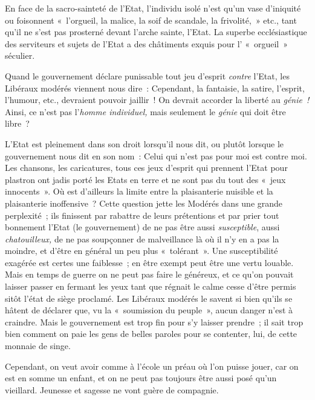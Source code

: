 \documentclass[french,twoside]{book} %
\begin{document}
En face de la sacro-sainteté de l’Etat, l’individu isolé n’est qu’un vase d’iniquité ou foisonnent « l’orgueil, la malice, la soif de scandale, la frivolité, » etc., tant qu’il ne s’est pas prosterné devant l’arche sainte, l’Etat. La superbe ecclésiastique des serviteurs et sujets de l’Etat a des châtiments exquis pour l’ « orgueil » séculier.\par
Quand le gouvernement déclare punissable tout jeu d’esprit \emph{contre} l’Etat, les Libéraux modérés viennent nous dire : Cependant, la fantaisie, la satire, l’esprit, l’humour, etc., devraient pouvoir jaillir ! On devrait accorder la liberté au \emph{génie !} Ainsi, ce n’est pas l’\emph{homme individuel,} mais seulement le \emph{génie} qui doit être libre ?\par
L’Etat est pleinement dans son droit lorsqu’il nous dit, ou plutôt lorsque le gouvernement nous dit en son nom : Celui qui n’est pas pour moi est contre moi. Les chansons, les caricatures, tous ces jeux d’esprit qui prennent l’Etat pour plastron ont jadis  porté les Etats en terre et ne sont pas du tout des « jeux innocents ». Où est d’ailleurs la limite entre la plaisanterie nuisible et la plaisanterie inoffensive ? Cette question jette les Modérés dans une grande perplexité ; ils finissent par rabattre de leurs prétentions et par prier tout bonnement l’Etat (le gouvernement) de ne pas être aussi \emph{susceptible}, aussi \emph{chatouilleux,} de ne pas soupçonner de malveillance là où il n’y en a pas la moindre, et d’être en général un peu plus « tolérant ». Une susceptibilité exagérée est certes une faiblesse ; en être exempt peut être une vertu louable. Mais en temps de guerre on ne peut pas faire le généreux, et ce qu’on pouvait laisser passer en fermant les yeux tant que régnait le calme cesse d’être permis sitôt l’état de siège proclamé. Les Libéraux modérés le savent si bien qu’ils se hâtent de déclarer que, vu la « soumission du peuple », aucun danger n’est à craindre. Mais le gouvernement est trop fin pour s’y laisser prendre ; il sait trop bien comment on paie les gens de belles paroles pour se contenter, lui, de cette monnaie de singe.\par
Cependant, on veut avoir comme à l’école un préau où l’on puisse jouer, car on est en somme un enfant, et on ne peut pas toujours être aussi posé qu’un vieillard. Jeunesse et sagesse ne vont guère de compagnie.\par
\end{document}
